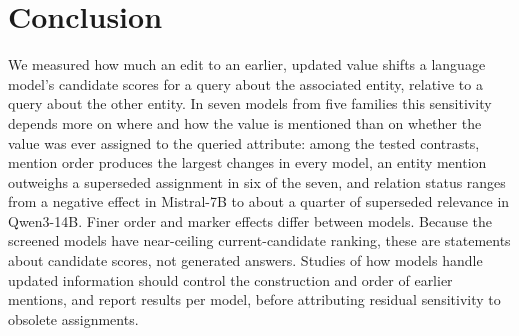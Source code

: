 \section{Conclusion}
\label{sec:conclusion}

We measured how much an edit to an earlier, updated value shifts a language model's candidate scores for a query about the associated entity, relative to a query about the other entity. In seven models from five families this sensitivity depends more on where and how the value is mentioned than on whether the value was ever assigned to the queried attribute: among the tested contrasts, mention order produces the largest changes in every model, an entity mention outweighs a superseded assignment in six of the seven, and relation status ranges from a negative effect in Mistral-7B to about a quarter of superseded relevance in Qwen3-14B. Finer order and marker effects differ between models. Because the screened models have near-ceiling current-candidate ranking, these are statements about candidate scores, not generated answers. Studies of how models handle updated information should control the construction and order of earlier mentions, and report results per model, before attributing residual sensitivity to obsolete assignments.

